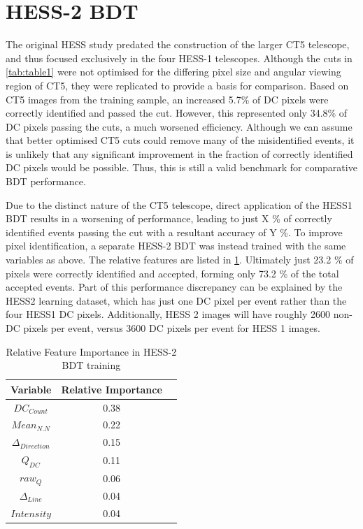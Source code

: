 \documentclass[]{article}
\begin{document}
\section{HESS-2 BDT}
The original HESS study predated the construction of the larger CT5 telescope, and thus focused exclusively in the four HESS-1 telescopes. Although the cuts in \ref{tab:table1} were not optimised for the differing pixel size and angular viewing region of CT5, they were replicated to provide a basis for comparison. Based on CT5 images from the training sample, an increased 5.7\% of DC pixels were correctly identified and passed the cut. However, this represented only 34.8\% of DC pixels passing the cuts, a much worsened efficiency. Although we can assume that better optimised CT5 cuts could remove many of the misidentified events, it is unlikely that any significant improvement in the fraction of correctly identified DC pixels would be possible. Thus, this is still a valid benchmark for comparative BDT performance. 

Due to the distinct nature of the CT5 telescope, direct application of the HESS1 BDT results in a worsening of performance, leading to just X \% of correctly identified events passing the cut with a resultant accuracy of Y \%. To improve pixel identification, a separate HESS-2 BDT was instead trained with the same variables as above. The relative features are listed in \ref{tab:table3}. Ultimately just 23.2 \% of pixels were correctly identified and accepted, forming only 73.2 \% of the total accepted events. Part of this performance discrepancy can be explained by the HESS2 learning dataset, which has just one DC pixel per event rather than the four HESS1 DC pixels. Additionally, HESS 2 images will have roughly 2600 non-DC pixels per event, versus 3600 DC pixels per event for HESS 1 images.

\begin{table}[h!]
  \centering
  \caption{Relative Feature Importance in HESS-2 BDT training}
  \label{tab:table3}
  \begin{tabular}{ccc}
    \toprule
    Variable & Relative Importance\\
    \midrule
    $DC_{Count}$ & 0.38\\
    $Mean_{N.N}$ & 0.22\\
    $\Delta_{Direction}$ & 0.15\\
    $Q_{DC}$ & 0.11\\
    $raw_{Q}$ & 0.06\\
    $\Delta_{Line}$ & 0.04\\
    $Intensity$ & 0.04\\
    \bottomrule
  \end{tabular}
\end{table}  
\end{document}
